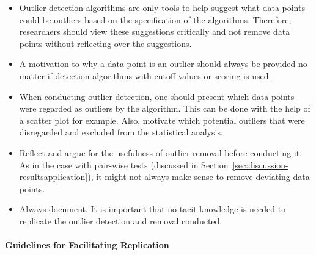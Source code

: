 \begin{itemize}


\item Outlier detection algorithms are only tools to help suggest what data points could be outliers based on the specification of the algorithms. Therefore, researchers should view these suggestions critically and not remove data points without reflecting over the suggestions.


\item A motivation to why a data point is an outlier should always be provided no matter if detection algorithms with cutoff values or scoring is used.


\item When conducting outlier detection, one should present which data points were regarded as outliers by the algorithm. This can be done with the help of a scatter plot for example. Also, motivate which potential outliers that were disregarded and excluded from the statistical analysis.


\item Reflect and argue for the usefulness of outlier removal before conducting it. As in the case with pair-wise tests (discussed in Section~\ref{sec:discussion-resultsapplication}), it might not always make sense to remove deviating data points.


\item Always document. It is important that no tacit knowledge is needed to replicate the outlier detection and removal conducted.


\end{itemize}




\paragraph{Guidelines for Facilitating Replication}


